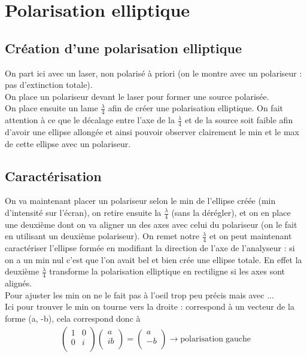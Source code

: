 \documentclass[12pt,prb,aps,epsf]{report}
\begin{document}
\section{Polarisation elliptique}
\subsection{Création d'une polarisation elliptique}
On part ici avec un laser, non polarisé à priori (on le montre avec un polariseur : pas d'extinction totale).\\
On place un polariseur devant le laser pour former une source polarisée.\\
On place ensuite un lame $\frac{\lambda}{4}$ afin de créer une polarisation elliptique. On fait attention à ce que le décalage entre l'axe de la $\frac{\lambda}{4}$ et de la source soit faible afin d'avoir une ellipse allongée et ainsi pouvoir observer clairement le min et le max de cette ellipse avec un polariseur.\\


\subsection{Caractérisation}

On va maintenant placer un polariseur selon le min de l'ellipse créée (min d'intensité sur l'écran), on retire ensuite la $\frac{\lambda}{4}$ (sans la dérégler), et on en place une deuxième dont on va aligner un des axes avec celui du polariseur (on le fait en utilisant un deuxième polariseur). On remet notre $\frac{\lambda}{4}$ et on peut maintenant caractériser l'ellipse formée en modifiant la direction de l'axe de l'analyseur : si on a un min nul c'est que l'on avait bel et bien crée une ellipse totale. En effet la deuxième $\frac{\lambda}{4}$ transforme la polarisation elliptique en rectiligne si les axes sont alignés.\\
Pour ajuster les min on ne le fait pas à l'oeil trop peu précis mais avec ...\\
Ici pour trouver le min on tourne vers la droite : correspond à un vecteur de la forme (a, -b), cela correspond donc à
\begin{eqnarray}
\left(
\begin{matrix}
1 & 0\\  
0 & i\\ 
\end{matrix}
\right)
\left(
\begin{matrix}
a\\ib\\
\end{matrix}\right)
=\left(
\begin{matrix}
a\\-b\\
\end{matrix}\right) \rightarrow \mathrm{polarisation\;gauche}
\end{eqnarray}
\end{document}
